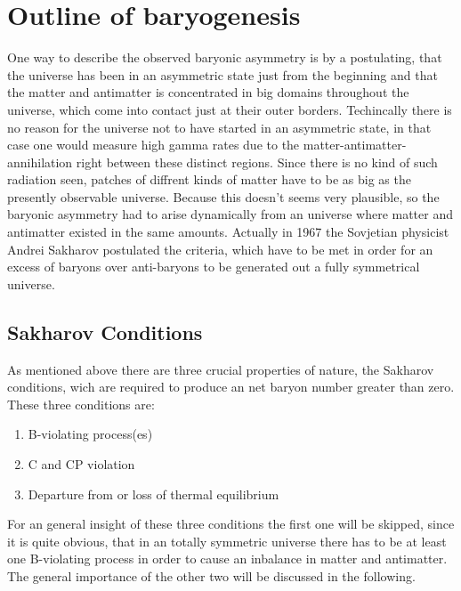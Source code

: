 \chapter{Outline of baryogenesis}
One way to describe the observed baryonic asymmetry is by a postulating, that the universe has been in an asymmetric state just from the beginning and that the matter and antimatter is concentrated in big domains throughout the universe, which come into contact just at their outer borders. Techincally there is no reason for the universe not to have started in an asymmetric state, in that case one would measure high gamma rates due to the matter-antimatter-annihilation right between these distinct regions. \newline
Since there is no kind of such radiation seen, patches of diffrent kinds of matter have to be as big as the presently observable universe. Because this doesn't seems very plausible, so the baryonic asymmetry had to arise dynamically from an universe where matter and antimatter existed in the same amounts. \newline
Actually in 1967 the Sovjetian physicist Andrei Sakharov postulated the criteria, which have to be met in order for an excess of baryons over anti-baryons to be generated out a fully symmetrical universe.
\section{Sakharov Conditions}
As mentioned above there are three crucial properties of nature, the Sakharov conditions, wich are required to produce an net baryon number greater than zero. These three conditions are:
\begin{enumerate}
	\item B-violating process(es)
	\item C and CP violation
	\item Departure from or loss of thermal equilibrium
\end{enumerate}
For an general insight of these three conditions the first one will be skipped, since it is quite obvious, that in an totally symmetric universe there has to be at least one B-violating process in order to cause an inbalance in matter and antimatter. \newline
The general importance of the other two will be discussed in the following.
